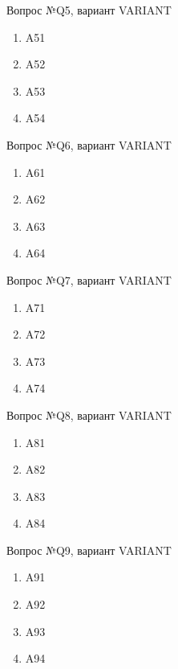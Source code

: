 \documentclass[a4paper,5pt]{article}
\begin{document}
	
	\begin{center}
		Вопрос №Q5, вариант VARIANT
	\end{center}
	\newline
	\begin{enumerate}
		\item A51
		\item A52
		\item A53
		\item A54
	\end{enumerate}
	
	
	\begin{center}
		Вопрос №Q6, вариант VARIANT
	\end{center}
	\newline
	\begin{enumerate}
		\item A61
		\item A62
		\item A63
		\item A64
	\end{enumerate}
   
	\begin{center}
		Вопрос №Q7, вариант VARIANT
	\end{center}
	\newline
	\begin{enumerate}
		\item A71
		\item A72
		\item A73
		\item A74
	\end{enumerate}
	
	
	\begin{center}
		Вопрос №Q8, вариант VARIANT
	\end{center}
	\newline
	\begin{enumerate}
		\item A81
		\item A82
		\item A83
		\item A84
	\end{enumerate}
	
	
	\begin{center}
		Вопрос №Q9, вариант VARIANT
	\end{center}
	\newline
	\begin{enumerate}
		\item A91
		\item A92
		\item A93
		\item A94
	\end{enumerate}
	

 
\end{document}
